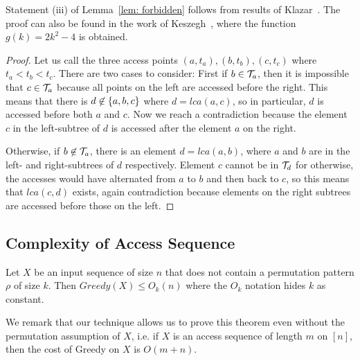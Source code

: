 Statement (iii) of Lemma~\ref{lem: forbidden} follows from results of Klazar~\cite{klazar}. The proof can also be found in the work of Keszegh~\cite{keszegh}, where the function $g(k) = 2k^2 - 4$ is obtained.

\fi
\iffalse

\begin{proof} 
Let us call the three access points $(a,t_a), (b,t_b), (c,t_c)$ where $t_a < t_b < t_c$. 
There are two cases to consider: First if $b \in {\mathcal T}_a$, then it is impossible that $c \in {\mathcal T}_a$ because all points on the left are accessed before the right. This means that there is $d \not \in \left\{ a,b,c \right\}$ where $d = lca(a,c)$, so in particular, $d$ is accessed before both $a$ and $c$. 
Now we reach a contradiction because the element $c$ in the left-subtree of $d$ is accessed after the element $a$ on the right. 


Otherwise, if $b \not \in {\mathcal T}_a$, there is an element $d = lca(a,b)$, where $a$ and $b$ are in the left- and right-subtrees of $d$ respectively. 
Element $c$ cannot be in ${\mathcal T}_d$ for otherwise, the accesses would have alternated from $a$ to $b$ and then back to $c$, so this means that $lca(c,d)$ exists, again contradiction because elements on the right subtrees are accessed before those on the left.     
\end{proof} 
\subsection{Complexity of Access Sequence} 
 
\begin{theorem}
Let $X$ be an input sequence of size $n$ that does not contain a permutation pattern $\rho$ of size $k$. Then $Greedy(X) \leq O_k(n)$ where the $O_k$ notation hides $k$ as constant.  
\end{theorem}


We remark that our technique allows us to prove this theorem even without the permutation assumption of $X$, i.e. if $X$ is an access sequence of length $m$ on $[n]$, then the cost of {\sc Greedy} on $X$ is $O(m+n)$. 


